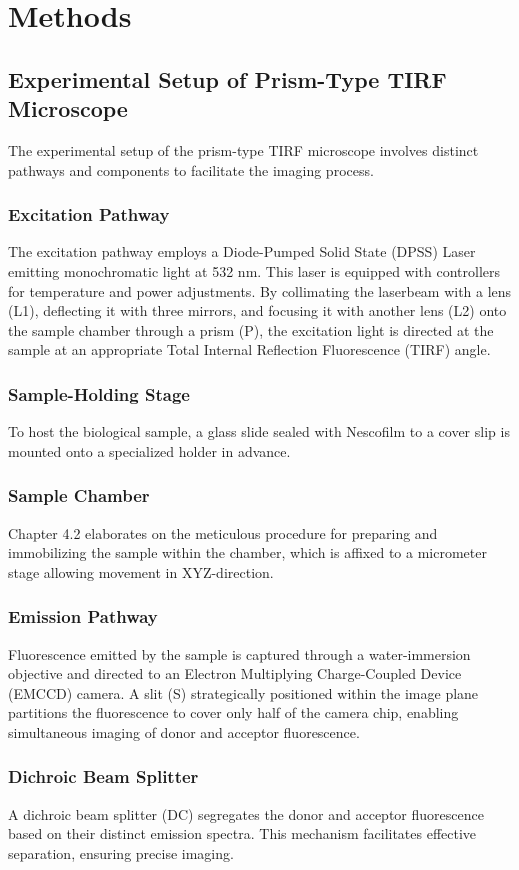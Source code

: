 \documentclass[a4paper,english,12pt,bibliography=totoc]{scrreprt}
\begin{document}
\section{Methods}
\label{sec:methods}

\subsection{Experimental Setup of Prism-Type TIRF Microscope}
The experimental setup of the prism-type TIRF microscope involves distinct pathways and components to facilitate the imaging process.
\subsubsection{Excitation Pathway}
The excitation pathway employs a Diode-Pumped Solid State (DPSS) Laser emitting monochromatic light at 532 nm. This laser is equipped with controllers for temperature and power adjustments. By collimating the laserbeam with a lens (L1), deflecting it with three mirrors, and focusing it with another lens (L2) onto the sample chamber through a prism (P), the excitation light is directed at the sample at an appropriate Total Internal Reflection Fluorescence (TIRF) angle.
\subsubsection{Sample-Holding Stage}
To host the biological sample, a glass slide sealed with Nescofilm to a cover slip is mounted onto a specialized holder in advance.
\subsubsection{Sample Chamber}
Chapter 4.2 elaborates on the meticulous procedure for preparing and immobilizing the sample within the chamber, which is affixed to a micrometer stage allowing movement in XYZ-direction.
\subsubsection{Emission Pathway}
Fluorescence emitted by the sample is captured through a water-immersion objective and directed to an Electron Multiplying Charge-Coupled Device (EMCCD) camera. A slit (S) strategically positioned within the image plane partitions the fluorescence to cover only half of the camera chip, enabling simultaneous imaging of donor and acceptor fluorescence.
\subsubsection{Dichroic Beam Splitter}
A dichroic beam splitter (DC) segregates the donor and acceptor fluorescence based on their distinct emission spectra. This mechanism facilitates effective separation, ensuring precise imaging.
\end{document}
